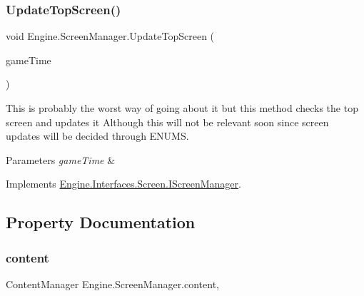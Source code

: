 \mbox{\label{a00538_a59b04e135a3b2a75a608752e2bfabc77}} 
\subsubsection{\texorpdfstring{Update\+Top\+Screen()}{UpdateTopScreen()}}
{\footnotesize\ttfamily void Engine.\+Screen\+Manager.\+Update\+Top\+Screen (\begin{DoxyParamCaption}\item[{Game\+Time}]{game\+Time }\end{DoxyParamCaption})\hspace{0.3cm}{\ttfamily [inline]}}



This is probably the worst way of going about it but this method checks the top screen and updates it Although this will not be relevant soon since screen updates will be decided through E\+N\+U\+MS. 


\begin{DoxyParams}{Parameters}
{\em game\+Time} & \\
\hline
\end{DoxyParams}


Implements \hyperlink{a00470_aff4347b40d3fd6173e0c420adbf1146f}{Engine.\+Interfaces.\+Screen.\+I\+Screen\+Manager}.



\subsection{Property Documentation}
\mbox{\label{a00538_aab6681c2803637c394081f3132dd2846}} 
\subsubsection{\texorpdfstring{content}{content}}
{\footnotesize\ttfamily Content\+Manager Engine.\+Screen\+Manager.\+content\hspace{0.3cm}{\ttfamily [get]}, {\ttfamily [set]}}

\mbox{\label{a00538_a8fb99d85abd848bad9d850b742398801}} 
